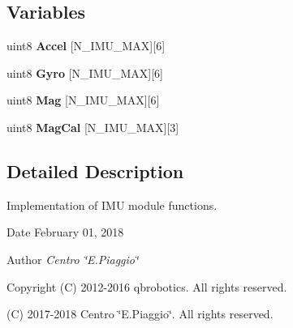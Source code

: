 \subsection*{Variables}
\begin{DoxyCompactItemize}
\item 
\mbox{\label{_i_m_u__functions_8c_a187c605f3898cf11e09f6f469c265920}} 
uint8 {\bfseries Accel} [N\+\_\+\+I\+M\+U\+\_\+\+M\+AX][6]
\item 
\mbox{\label{_i_m_u__functions_8c_a49dba88a31d1b3b4190065b9ef1649fe}} 
uint8 {\bfseries Gyro} [N\+\_\+\+I\+M\+U\+\_\+\+M\+AX][6]
\item 
\mbox{\label{_i_m_u__functions_8c_a5d88408ccb73729f049a52b4d1daaadf}} 
uint8 {\bfseries Mag} [N\+\_\+\+I\+M\+U\+\_\+\+M\+AX][6]
\item 
\mbox{\label{_i_m_u__functions_8c_a1e598e1bdae5fe927fbd1f396161f3a6}} 
uint8 {\bfseries Mag\+Cal} [N\+\_\+\+I\+M\+U\+\_\+\+M\+AX][3]
\end{DoxyCompactItemize}


\subsection{Detailed Description}
Implementation of I\+MU module functions. 

\begin{DoxyDate}{Date}
February 01, 2018 
\end{DoxyDate}
\begin{DoxyAuthor}{Author}
{\itshape Centro \char`\"{}\+E.\+Piaggio\char`\"{}} 
\end{DoxyAuthor}
\begin{DoxyCopyright}{Copyright}
(C) 2012-\/2016 qbrobotics. All rights reserved. 

(C) 2017-\/2018 Centro \char`\"{}\+E.\+Piaggio\char`\"{}. All rights reserved. 
\end{DoxyCopyright}

